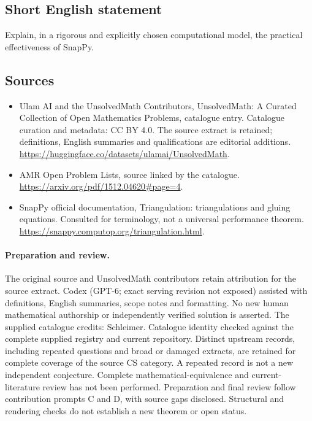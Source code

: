 \documentclass[11pt]{article}
\begin{document}
\subsection{Short English statement}
Explain, in a rigorous and explicitly chosen computational model, the practical effectiveness of SnapPy.
\subsection{Sources}
\begin{itemize}
\item[\hypertarget{source:statement:1}{S1}] Ulam AI and the UnsolvedMath Contributors, UnsolvedMath: A Curated Collection of Open Mathematics Problems, catalogue entry. Catalogue curation and metadata: CC BY 4.0. The source extract is retained; definitions, English summaries and qualifications are editorial additions.
\url{https://huggingface.co/datasets/ulamai/UnsolvedMath}.
\item[\hypertarget{source:statement:2}{S2}] AMR Open Problem Lists, source linked by the catalogue.
\url{https://arxiv.org/pdf/1512.04620#page=4}.
\item[\hypertarget{source:statement:3}{S3}] SnapPy official documentation, Triangulation: triangulations and gluing equations. Consulted for terminology, not a universal performance theorem.
\url{https://snappy.computop.org/triangulation.html}.
\end{itemize}
\paragraph{Preparation and review.}
The original source and UnsolvedMath contributors retain attribution for the source extract. Codex (GPT-6; exact serving revision not exposed) assisted with definitions, English summaries, scope notes and formatting. No new human mathematical authorship or independently verified solution is asserted. The supplied catalogue credits: Schleimer. Catalogue identity checked against the complete supplied registry and current repository. Distinct upstream records, including repeated questions and broad or damaged extracts, are retained for complete coverage of the source CS category. A repeated record is not a new independent conjecture. Complete mathematical-equivalence and current-literature review has not been performed. Preparation and final review follow contribution prompts C and D, with source gaps disclosed. Structural and rendering checks do not establish a new theorem or open status.
\label{end:statement}
\end{document}
